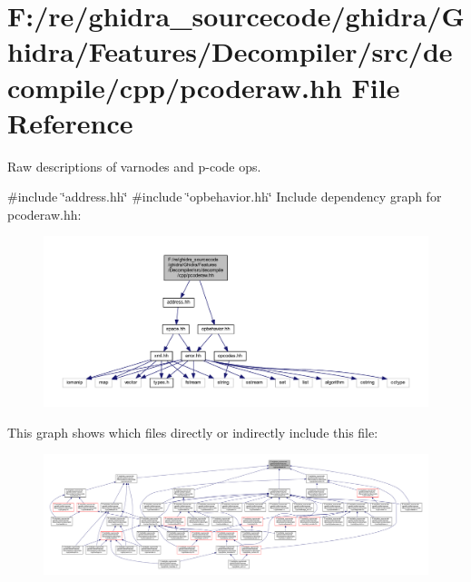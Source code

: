 \hypertarget{pcoderaw_8hh}{}\section{F\+:/re/ghidra\+\_\+sourcecode/ghidra/\+Ghidra/\+Features/\+Decompiler/src/decompile/cpp/pcoderaw.hh File Reference}
\label{pcoderaw_8hh}


Raw descriptions of varnodes and p-\/code ops.  


{\ttfamily \#include \char`\"{}address.\+hh\char`\"{}}\newline
{\ttfamily \#include \char`\"{}opbehavior.\+hh\char`\"{}}\newline
Include dependency graph for pcoderaw.\+hh\+:
\nopagebreak
\begin{figure}[H]
\begin{center}
\leavevmode
\includegraphics[width=350pt]{pcoderaw_8hh__incl}
\end{center}
\end{figure}
This graph shows which files directly or indirectly include this file\+:
\nopagebreak
\begin{figure}[H]
\begin{center}
\leavevmode
\includegraphics[width=350pt]{pcoderaw_8hh__dep__incl}
\end{center}
\end{figure}

